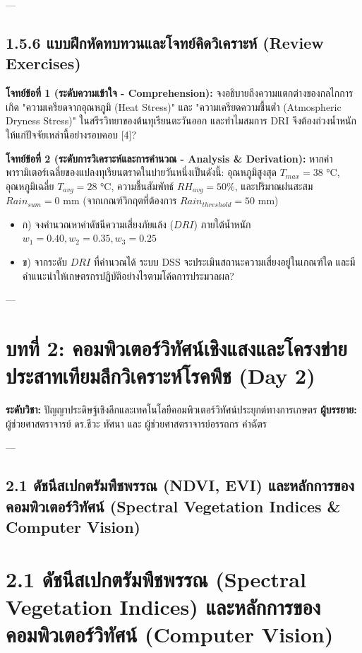 \documentclass[11pt,a4paper,openany]{report}
\begin{document}
---

\section{1.5.6 แบบฝึกหัดทบทวนและโจทย์คิดวิเคราะห์ (Review Exercises)}


\textbf{โจทย์ข้อที่ 1 (ระดับความเข้าใจ - Comprehension):}
จงอธิบายถึงความแตกต่างของกลไกการเกิด "ความเครียดจากอุณหภูมิ (Heat Stress)" และ "ความเครียดความชื้นต่ำ (Atmospheric Dryness Stress)" ในสรีรวิทยาของต้นทุเรียนตะวันออก และทำไมสมการ DRI จึงต้องถ่วงน้ำหนักให้แก่ปัจจัยเหล่านี้อย่างรอบคอบ [4]?

\textbf{โจทย์ข้อที่ 2 (ระดับการวิเคราะห์และการคำนวณ - Analysis \& Derivation):}
หากค่าพารามิเตอร์เฉลี่ยของแปลงทุเรียนตราดในบ่ายวันหนึ่งเป็นดังนี้: อุณหภูมิสูงสุด $T_{max} = 38\text{ °C}$, อุณหภูมิเฉลี่ย $T_{avg} = 28\text{ °C}$, ความชื้นสัมพัทธ์ $RH_{avg} = 50\%$, และปริมาณฝนสะสม $Rain_{sum} = 0\text{ mm}$ (จากเกณฑ์วิกฤตที่ต้องการ $Rain_{threshold} = 50\text{ mm}$)
\begin{itemize}
  \item ก) จงคำนวณหาค่าดัชนีความเสี่ยงภัยแล้ง ($DRI$) ภายใต้น้ำหนัก $w_1 = 0.40, w_2 = 0.35, w_3 = 0.25$
  \item ข) จากระดับ $DRI$ ที่คำนวณได้ ระบบ DSS จะประเมินสถานะความเสี่ยงอยู่ในเกณฑ์ใด และมีคำแนะนำให้เกษตรกรปฏิบัติอย่างไรตามโค้ดการประมวลผล?
\end{itemize}




---



\chapter{บทที่ 2: คอมพิวเตอร์วิทัศน์เชิงแสงและโครงข่ายประสาทเทียมลึกวิเคราะห์โรคพืช (Day 2)}


\textbf{ระดับวิชา:} ปัญญาประดิษฐ์เชิงลึกและเทคโนโลยีคอมพิวเตอร์วิทัศน์ประยุกต์ทางการเกษตร
\textbf{ผู้บรรยาย:} ผู้ช่วยศาสตราจารย์ ดร.ชีวะ ทัศนา และ ผู้ช่วยศาสตราจารย์อรรถกร คำฉัตร

---

\section{2.1 ดัชนีสเปกตรัมพืชพรรณ (NDVI, EVI) และหลักการของคอมพิวเตอร์วิทัศน์ (Spectral Vegetation Indices \& Computer Vision)}


\chapter{2.1 ดัชนีสเปกตรัมพืชพรรณ (Spectral Vegetation Indices) และหลักการของคอมพิวเตอร์วิทัศน์ (Computer Vision)}
\end{document}
